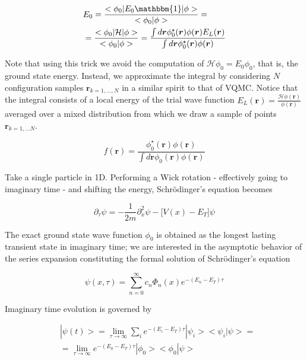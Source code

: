 \begin{equation}
\begin{split}
&E_0 = \frac{ < \phi_0 |E_0 \mathbbm{1} | \phi >}{< \phi_0 | \phi >} = \\
&= \frac{< \phi_0 | \mathcal{H} | \phi >}{ <\phi_0 | \phi >} = \frac{\int d\bm r \phi_0^\star (\bm r) \phi (\bm r) E_L (\bm r)}{\int d\bm r\phi_0^\star (\bm r) \phi (\bm r)}
\end{split}
\end{equation}

Note that using this trick we avoid the computation of $\mathcal{H} \phi_0 = E_0 \phi_0$, that is, the ground state energy. Instead, we approximate the integral by considering $N$ configuration samples $\bm r_{k = 1,..., N}$ in a similar spirit to that of VQMC. Notice that the integral consists of a local energy of the trial wave function $E_L (\bm r) = \frac{\mathcal{H} \phi (\bm r)}{\phi (\bm r)}$ averaged over a mixed distribution from which we draw a sample of points $\bm r_{k=1,...N}$.

\begin{equation}
f(\bm r) = \frac{\phi_0^\star (\bm r) \phi (\bm r) }{ \int d\bm r  \phi_0 (\bm r) \phi (\bm r)}
\end{equation}

Take a single particle in 1D. Performing a Wick rotation - effectively going to imaginary time - and shifting the energy, Schr\"odinger's equation becomes

\begin{equation}
\partial_\tau \psi = -\frac{1}{2m} \partial^2_x \psi - \bigg[ V(x) - E_T \bigg] \psi
\end{equation}

The exact ground state wave function $\phi_0$ is obtained as the longest lasting transient state in imaginary time; we are interested in the asymptotic behavior of the series expansion constituting the formal solution of Schr\"odinger's equation

\begin{equation}
\psi (x, \tau) = \sum_{n=0}^{\infty} c_n \Phi_n (x) e^{-(E_n - E_T)\tau}
\end{equation}

Imaginary time evolution is governed by

\begin{equation}\label{eq:im_ev}
\begin{split}
&| \psi (t) > = \lim_{\tau \rightarrow \infty} \sum_i e^{-(E_i - E_T) \tau} |\psi_i > <\psi_i | \psi > = \\
&= \lim_{\tau \rightarrow \infty} e^{-(E_0 - E_T)\tau} | \phi_0 >< \phi_0 | \psi > 
\end{split}
\end{equation}


